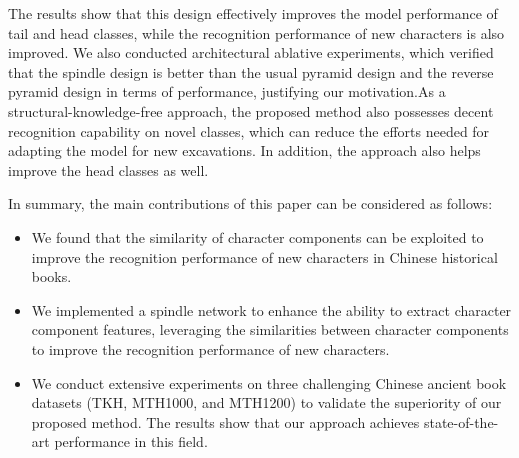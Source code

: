 The results show that this design effectively improves the model performance of tail and head classes, while the recognition performance of new characters is also improved. 
We also conducted architectural ablative experiments, which verified that the spindle design is better than the usual pyramid design and the reverse pyramid design in terms of performance, justifying our motivation.As a structural-knowledge-free approach, the proposed method also possesses decent recognition capability on novel classes, which can reduce the efforts needed for adapting the model for new excavations. In addition, the approach also helps improve the head classes as well. 

In summary, the main contributions of this paper can be considered as follows:
\begin{itemize}
\item We found that the similarity of character components can be exploited to improve the recognition performance of new characters in Chinese historical books.
\item We implemented a spindle network to enhance the ability to extract character component features, leveraging the similarities between character components to improve the recognition performance of new characters.
\item We conduct extensive experiments on three challenging Chinese ancient book datasets (TKH, MTH1000, and MTH1200) to validate the superiority of our proposed method. The results show that our approach achieves state-of-the-art performance in this field.
\end{itemize}
